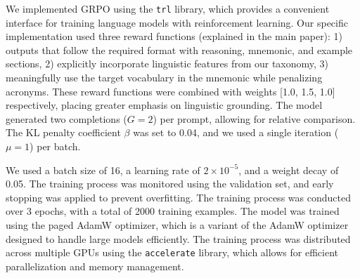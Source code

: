  \label{app:grpo-config}

We implemented GRPO using the \texttt{trl} library, which provides a convenient interface for training language models with reinforcement learning. Our specific implementation used three reward functions (explained in the main paper): 1) outputs that follow the required format with reasoning, mnemonic, and example sections, 2) explicitly incorporate linguistic features from our taxonomy, 3) meaningfully use the target vocabulary in the mnemonic while penalizing acronyms. These reward functions were combined with weights [1.0, 1.5, 1.0] respectively, placing greater emphasis on linguistic grounding. The model generated two completions ($G=2$) per prompt, allowing for relative comparison. The KL penalty coefficient $\beta$ was set to 0.04, and we used a single iteration ($\mu=1$) per batch.

We used a batch size of 16, a learning rate of \(2 \times 10^{-5}\), and a weight decay of 0.05. The training process was monitored using the validation set, and early stopping was applied to prevent overfitting. The training process was conducted over 3 epochs, with a total of 2000 training examples. The model was trained using the paged AdamW optimizer, which is a variant of the AdamW optimizer designed to handle large models efficiently. The training process was distributed across multiple GPUs using the \verb|accelerate| library, which allows for efficient parallelization and memory management.
